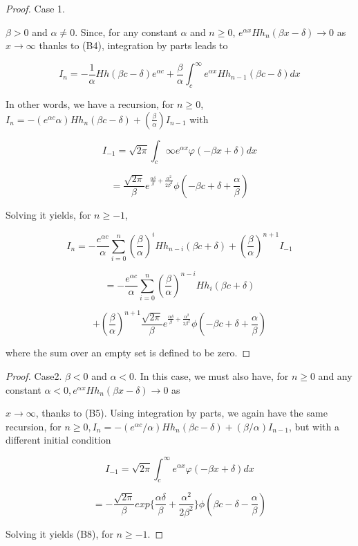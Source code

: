 \begin{proof}{Case 1.}

$\beta>0$ and $\alpha\neq0$. Since, for any constant $\alpha$ and $n \geq 0$, $e^{\alpha x} Hh_{n}(\beta x - \delta) \rightarrow 0$ as $x \rightarrow \infty$ thanks to (B4), integration by parts leads to

$$I_{n}=-\frac{1}{\alpha}Hh(\beta c -\delta) e^{\alpha c} + \frac{\beta}{\alpha}\int_{c}^{\infty} e^{\alpha x} Hh_{n-1}(\beta c - \delta)dx$$

In other words, we have a recursion, for $n \geq 0$, $I_{n}=-(e^{\alpha c}{\alpha})Hh_{n}(\beta c - \delta) + (\frac{\beta}{\alpha})I_{n-1}$ with

$$I_{-1}=\sqrt{2 \pi} \int_{c}{\infty}e^{\alpha x}\varphi(-\beta x +\delta)dx$$

$$=\frac{\sqrt{2 \pi}}{\beta} e^{\frac{\alpha \delta}{\beta}+\frac{\alpha^{2}}{2 \beta^{2}}}\phi(-\beta c + \delta +\frac{\alpha}{\beta})$$

Solving it yields, for $n \geq -1$,

$$I_{n}=-\frac{e^{\alpha c}}{\alpha}\sum_{i=0}^{n}(\frac{\beta}{\alpha})^{i}Hh_{n-i}(\beta c+\delta) + (\frac{\beta}{\alpha})^{n+1}I_{-1}$$

$$=-\frac{e^{\alpha c}}{\alpha}\sum_{i=0}^{n}(\frac{\beta}{\alpha})^{n-i} Hh_{i}(\beta c+\delta)$$

$$+ (\frac{\beta}{\alpha})^{n+1}\frac{\sqrt{2 \pi}}{\beta} e^{\frac{\alpha \delta}{\beta}+\frac{\alpha^{2}}{2 \beta^{2}}}\phi(-\beta c + \delta +\frac{\alpha}{\beta})$$

where the sum over an empty set is defined to be zero.
\end{proof}

\begin{proof}{Case2.} $\beta<0$ and $\alpha<0$. In this case, we must also have, for $n \geq 0$ and any constant $\alpha<0, e^{\alpha x}Hh_{n}(\beta x -\delta) \rightarrow 0$ as

$x \rightarrow \infty$, thanks to (B5). Using integration by parts, we again have the same recursion, for $n \geq 0, I_{n}=-(e^{\alpha c}/\alpha)Hh_{n}(\beta c - \delta)+(\beta / \alpha)I_{n-1}$, but with a different initial condition

$$I_{-1}=\sqrt{2 \pi}\int_{c}^{\infty}e^{\alpha x}\varphi(-\beta x + \delta)dx$$

$$=-\frac{\sqrt{2 \pi}}{\beta} exp\{\frac{\alpha \delta}{\beta}+\frac{\alpha^{2}}{2 \beta^{2}}\}\phi(\beta c - \delta -\frac{\alpha}{\beta})$$

Solving it yields (B8), for $n \geq -1$.

\end{proof}

